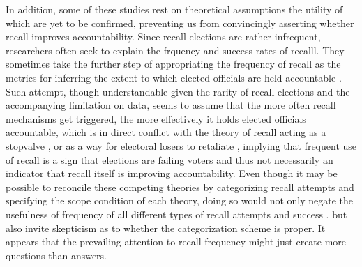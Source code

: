 \documentclass{article}
\begin{document}
		
		In addition,
		some of these studies rest on theoretical assumptions
		the utility of which are yet to be confirmed,
		preventing us from convincingly asserting
		whether recall improves accountability.
		Since recall elections are rather infrequent,
		researchers often seek to explain
		the frquency and success rates of recalll.
		They sometimes take the further step of appropriating
		the frequency of recall
		as the metrics for inferring 
		the extent to which elected officials are held accountable
		\autocite{hamanRecallElectionsTool2021,okamotoRecallJapanMeasure2020,qvortrupHastaVistaComparative2011}.
		Such attempt,
		though understandable given the rarity of recall elections and the accompanying limitation on data,
		seems to assume that the more often recall mechanisms get triggered,
		the more effectively it holds elected officials accountable,
		which is in direct conflict with
		the theory of recall acting as a stopvalve 
		\autocite{serdultHistoryDormantInstitution2015, welpRecallDemocraticAdvance2020},
		or as a way for electoral losers to retaliate
		\autocite{welpRecallReferendumsPeruvian2016},
		implying that frequent use of recall is a sign that elections are failing voters and thus
		not necessarily an indicator that recall itself is improving accountability.
		Even though it may be possible to reconcile these competing theories by 
		categorizing recall attempts and 
		specifying the scope condition of each theory,
		doing so would not only
		negate the usefulness of frequency of all different types of recall attempts and success .
		but also
		invite skepticism as to whether the categorization scheme is proper.
		It appears that the prevailing attention to recall frequency
		might just create more questions than answers.
		
\end{document}

